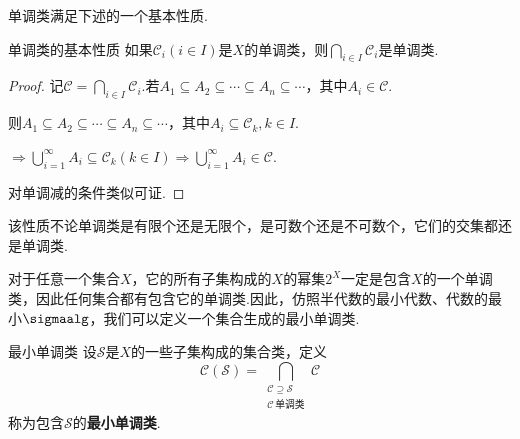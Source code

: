 单调类满足下述的一个基本性质.
\begin{proposition}{单调类的基本性质}
    如果$\mathcal{C}_i(i\in I)$是$X$的单调类，则$\bigcap_{i\in I}{\mathcal{C}_i}$是单调类.
\end{proposition}
\begin{proof}
    记$\mathcal{C}=\bigcap_{i\in I}{\mathcal{C}_i}$.若$A_1\subseteq A_2\subseteq\cdots \subseteq A_n\subseteq\cdots$，其中$A_i\in\mathcal{C}$.\par
    则$A_1\subseteq A_2\subseteq\cdots\subseteq A_n\subseteq\cdots$，其中$A_i\subseteq \mathcal{C}_k,k\in I$.\par
    $\Rightarrow \bigcup_{i=1}^\infty{A_i}\subseteq\mathcal{C}_k(k\in I)\Rightarrow \bigcup_{i=1}^\infty{A_i}\in\mathcal{C}$.\par
    对单调减的条件类似可证.
\end{proof}
该性质不论单调类是有限个还是无限个，是可数个还是不可数个，它们的交集都还是单调类.\par
对于任意一个集合$X$，它的所有子集构成的$X$的幂集$2^X$一定是包含$X$的一个单调类，因此任何集合都有包含它的单调类.因此，仿照半代数的最小代数、代数的最小$\sigmaalg$，我们可以定义一个集合生成的最小单调类.
\begin{definition}{最小单调类}
    设$\mathcal{S}$是$X$的一些子集构成的集合类，定义
    \[\mathcal{C}(\mathcal{S})=\bigcap_{\substack{\mathcal{C}\supseteq\mathcal{S}\\ \mathcal{C}\,\text{单调类}}}{\mathcal{C}}\]
    称为包含$\mathcal{S}$的\textbf{最小单调类}.
\end{definition}

